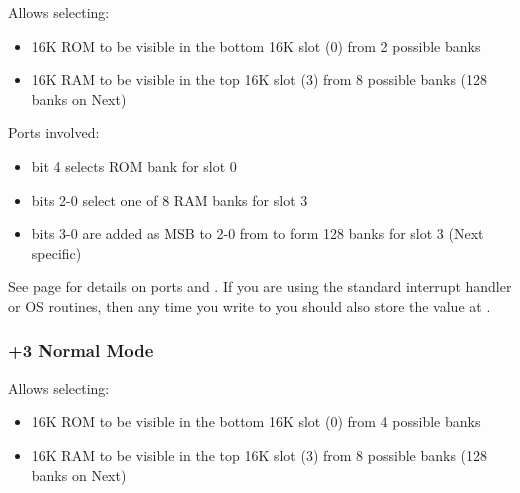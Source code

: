 Allows selecting:

\begin{itemize}[topsep=0pt,itemsep=0pt]
	\item 16K ROM to be visible in the bottom 16K slot (0) from 2 possible banks
	\item 16K RAM to be visible in the top 16K slot (3) from 8 possible banks (128 banks on Next)
\end{itemize}

Ports involved:

\begin{itemize}[topsep=0pt,itemsep=0pt]
	\item {} bit 4 selects ROM bank for slot 0
	\item {} bits 2-0 select one of 8 RAM banks for slot 3
	\item {} bits 3-0 are added as MSB to 2-0 from  to form 128 banks for slot 3 (Next specific)
\end{itemize}

See page  for details on ports  and . If you are using the standard interrupt handler or OS routines, then any time you write to  you should also store the value at .


\subsubsection{+3 Normal Mode}

\begin{PagingTableLegacy}
	\PagingTableLegacyItem{}{$\uparrow$}{}{}{$\uparrow$}
\end{PagingTableLegacy}

Allows selecting:

\begin{itemize}[topsep=0pt,itemsep=0pt]
	\item 16K ROM to be visible in the bottom 16K slot (0) from 4 possible banks
	\item 16K RAM to be visible in the top 16K slot (3) from 8 possible banks (128 banks on Next)
\end{itemize}

